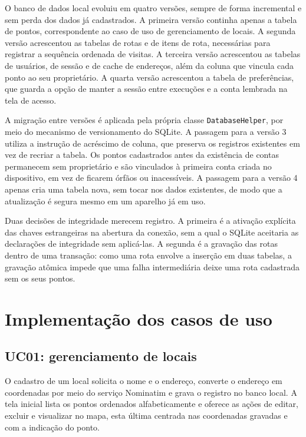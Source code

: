 O banco de dados local evoluiu em quatro versões, sempre de forma incremental e sem perda dos dados já cadastrados. A primeira versão continha apenas a tabela de pontos, correspondente ao caso de uso de gerenciamento de locais. A segunda versão acrescentou as tabelas de rotas e de itens de rota, necessárias para registrar a sequência ordenada de visitas. A terceira versão acrescentou as tabelas de usuários, de sessão e de cache de endereços, além da coluna que vincula cada ponto ao seu proprietário. A quarta versão acrescentou a tabela de preferências, que guarda a opção de manter a sessão entre execuções e a conta lembrada na tela de acesso.

A migração entre versões é aplicada pela própria classe \texttt{DatabaseHelper}, por meio do mecanismo de versionamento do SQLite. A passagem para a versão 3 utiliza a instrução de acréscimo de coluna, que preserva os registros existentes em vez de recriar a tabela. Os pontos cadastrados antes da existência de contas permanecem sem proprietário e são vinculados à primeira conta criada no dispositivo, em vez de ficarem órfãos ou inacessíveis. A passagem para a versão 4 apenas cria uma tabela nova, sem tocar nos dados existentes, de modo que a atualização é segura mesmo em um aparelho já em uso.

Duas decisões de integridade merecem registro. A primeira é a ativação explícita das chaves estrangeiras na abertura da conexão, sem a qual o SQLite aceitaria as declarações de integridade sem aplicá-las. A segunda é a gravação das rotas dentro de uma transação: como uma rota envolve a inserção em duas tabelas, a gravação atômica impede que uma falha intermediária deixe uma rota cadastrada sem os seus pontos.

\section{Implementação dos casos de uso}

\subsection{UC01: gerenciamento de locais}

O cadastro de um local solicita o nome e o endereço, converte o endereço em coordenadas por meio do serviço Nominatim e grava o registro no banco local. A tela inicial lista os pontos ordenados alfabeticamente e oferece as ações de editar, excluir e visualizar no mapa, esta última centrada nas coordenadas gravadas e com a indicação do ponto.

